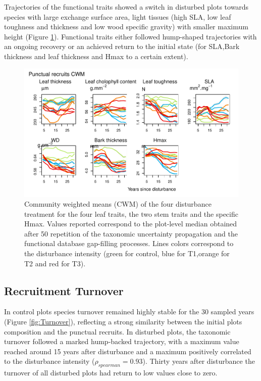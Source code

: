 \documentclass[fleqn,10pt]{ArtEcoFoG} %
\begin{document}
Trajectories of the functional traits showed a switch in disturbed plots
towards species with large exchange surface area, light tissues (high
SLA, low leaf toughness and thickness and low wood specific gravity)
with smaller maximum height (Figure \ref{fig:CWM}). Functional traits
either followed hump-shaped trajectories with an ongoing recovery or an
achieved return to the initial state (for SLA,Bark thickness and leaf
thickness and Hmax to a certain extent).

\begin{figure}

{\centering \includegraphics[width=0.8\linewidth]{RecruitmentTrajectories_files/figure-latex/CWM-1} 

}

\caption{Community weighted means (CWM) of the four disturbance treatment for the four leaf traits, the two stem traits  and the specific Hmax. Values reported correspond to the plot-level median obtained after 50 repetition of the taxonomic uncertainty propagation and the functional database gap-filling processes. Lines colors correspond to the disturbance intensity (green for control, blue for T1,orange for T2 and red for T3).}\label{fig:CWM}
\end{figure}

\subsection{Recruitment Turnover}\label{recruitment-turnover}

In control plots species turnover remained highly stable for the 30
sampled years (Figure \ref{fig:Turnover}), reflecting a strong
similarity between the initial plots composition and the punctual
recruits. In disturbed plots, the taxonomic turnover followed a marked
hump-backed trajectory, with a maximum value reached around 15 years
after disturbance and a maximum positively correlated to the disturbance
intensity (\(\rho_{spearman}=0.93\)). Thirty years after disturbance the
turnover of all disturbed plots had return to low values close to zero.
\end{document}
